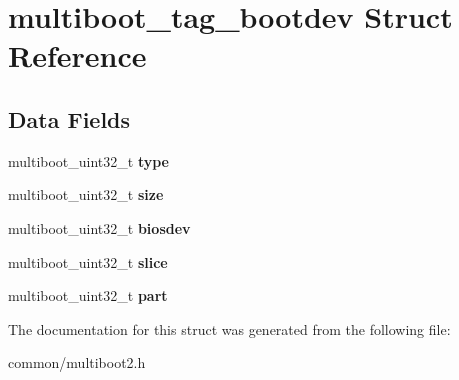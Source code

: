 \hypertarget{structmultiboot__tag__bootdev}{}\section{multiboot\+\_\+tag\+\_\+bootdev Struct Reference}
\label{structmultiboot__tag__bootdev}
\subsection*{Data Fields}
\begin{DoxyCompactItemize}
\item 
multiboot\+\_\+uint32\+\_\+t {\bfseries type}\hypertarget{structmultiboot__tag__bootdev_a80f58414b4caf448202e9cf5fa6a471e}{}\label{structmultiboot__tag__bootdev_a80f58414b4caf448202e9cf5fa6a471e}

\item 
multiboot\+\_\+uint32\+\_\+t {\bfseries size}\hypertarget{structmultiboot__tag__bootdev_a24f9b45b64523436ef57e2a123a8c049}{}\label{structmultiboot__tag__bootdev_a24f9b45b64523436ef57e2a123a8c049}

\item 
multiboot\+\_\+uint32\+\_\+t {\bfseries biosdev}\hypertarget{structmultiboot__tag__bootdev_a2bcf5d32579dc281148607d937ca099b}{}\label{structmultiboot__tag__bootdev_a2bcf5d32579dc281148607d937ca099b}

\item 
multiboot\+\_\+uint32\+\_\+t {\bfseries slice}\hypertarget{structmultiboot__tag__bootdev_a50f53a5f93c66c721734cd44f6ea56b0}{}\label{structmultiboot__tag__bootdev_a50f53a5f93c66c721734cd44f6ea56b0}

\item 
multiboot\+\_\+uint32\+\_\+t {\bfseries part}\hypertarget{structmultiboot__tag__bootdev_ac34809553805874feb470308a2baa1e1}{}\label{structmultiboot__tag__bootdev_ac34809553805874feb470308a2baa1e1}

\end{DoxyCompactItemize}


The documentation for this struct was generated from the following file\+:\begin{DoxyCompactItemize}
\item 
common/multiboot2.\+h\end{DoxyCompactItemize}
